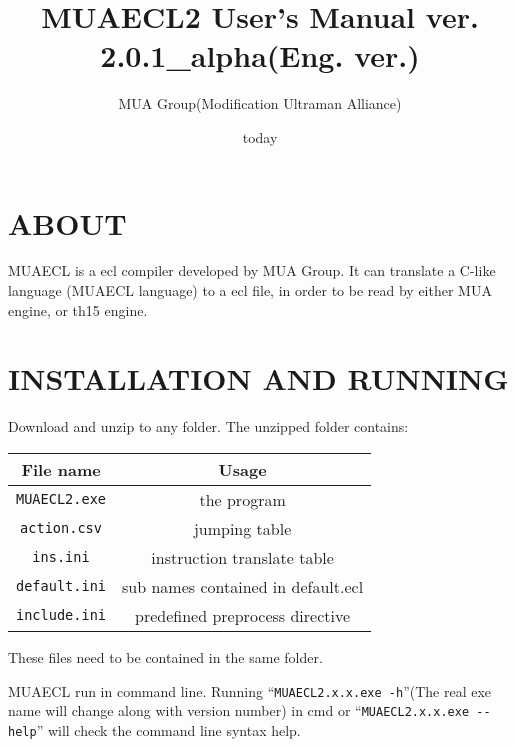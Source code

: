 \documentclass{article}
\author{MUA Group(Modification Ultraman Alliance)}
\title{MUAECL2 User's Manual  ver. 2.0.1\_alpha(Eng. ver.)}
\date{today}
\begin{document}
\maketitle
\tableofcontents
\clearpage

\section{ABOUT}

MUAECL is a ecl compiler developed by MUA Group. It can translate a C-like language (MUAECL language) to a ecl file, in order to be read by either MUA engine, or th15 engine.

\section{INSTALLATION AND RUNNING}

Download and unzip to any folder. The unzipped folder contains:

\begin{table}[H]
	\centering
	\begin{tabular}{c|c}
		\hline
		File name & Usage \\\hline
		\verb|MUAECL2.exe| & the program \\\hline
		\verb|action.csv| & jumping table \\\hline
		\verb|ins.ini| & instruction translate table \\\hline
		\verb|default.ini| & sub names contained in default.ecl \\\hline
		\verb|include.ini| & predefined preprocess directive \\\hline
	\end{tabular}
\end{table}

These files need to be contained in the same folder.

MUAECL run in command line. Running ``\verb|MUAECL2.x.x.exe -h|''(The real exe name will change along with version number) in cmd or ``\verb|MUAECL2.x.x.exe --help|'' will check the command line syntax help.
\end{document}
